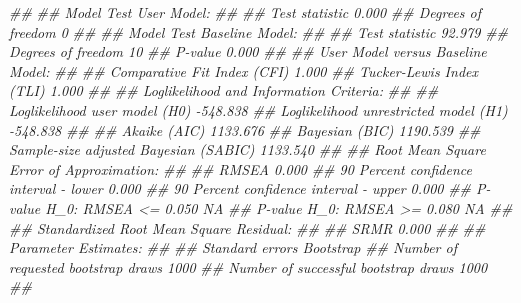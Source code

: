 \documentclass[
  chinese-hans,
  letterpaper,
  DIV=11,
  numbers=noendperiod]{scrartcl}
\newenvironment{Shaded}{\begin{snugshade}}{\end{snugshade}}
\newcommand{\DocumentationTok}[1]{\textcolor[rgb]{0.37,0.37,0.37}{\textit{#1}}}
\begin{document}
\begin{Shaded}
\begin{Highlighting}[numbers=left,,]
\DocumentationTok{\#\# }
\DocumentationTok{\#\# Model Test User Model:}
\DocumentationTok{\#\#                                                       }
\DocumentationTok{\#\#   Test statistic                                 0.000}
\DocumentationTok{\#\#   Degrees of freedom                                 0}
\DocumentationTok{\#\# }
\DocumentationTok{\#\# Model Test Baseline Model:}
\DocumentationTok{\#\# }
\DocumentationTok{\#\#   Test statistic                                92.979}
\DocumentationTok{\#\#   Degrees of freedom                                10}
\DocumentationTok{\#\#   P{-}value                                        0.000}
\DocumentationTok{\#\# }
\DocumentationTok{\#\# User Model versus Baseline Model:}
\DocumentationTok{\#\# }
\DocumentationTok{\#\#   Comparative Fit Index (CFI)                    1.000}
\DocumentationTok{\#\#   Tucker{-}Lewis Index (TLI)                       1.000}
\DocumentationTok{\#\# }
\DocumentationTok{\#\# Loglikelihood and Information Criteria:}
\DocumentationTok{\#\# }
\DocumentationTok{\#\#   Loglikelihood user model (H0)               {-}548.838}
\DocumentationTok{\#\#   Loglikelihood unrestricted model (H1)       {-}548.838}
\DocumentationTok{\#\#                                                       }
\DocumentationTok{\#\#   Akaike (AIC)                                1133.676}
\DocumentationTok{\#\#   Bayesian (BIC)                              1190.539}
\DocumentationTok{\#\#   Sample{-}size adjusted Bayesian (SABIC)       1133.540}
\DocumentationTok{\#\# }
\DocumentationTok{\#\# Root Mean Square Error of Approximation:}
\DocumentationTok{\#\# }
\DocumentationTok{\#\#   RMSEA                                          0.000}
\DocumentationTok{\#\#   90 Percent confidence interval {-} lower         0.000}
\DocumentationTok{\#\#   90 Percent confidence interval {-} upper         0.000}
\DocumentationTok{\#\#   P{-}value H\_0: RMSEA \textless{}= 0.050                       NA}
\DocumentationTok{\#\#   P{-}value H\_0: RMSEA \textgreater{}= 0.080                       NA}
\DocumentationTok{\#\# }
\DocumentationTok{\#\# Standardized Root Mean Square Residual:}
\DocumentationTok{\#\# }
\DocumentationTok{\#\#   SRMR                                           0.000}
\DocumentationTok{\#\# }
\DocumentationTok{\#\# Parameter Estimates:}
\DocumentationTok{\#\# }
\DocumentationTok{\#\#   Standard errors                            Bootstrap}
\DocumentationTok{\#\#   Number of requested bootstrap draws             1000}
\DocumentationTok{\#\#   Number of successful bootstrap draws            1000}
\DocumentationTok{\#\# }

\end{Highlighting}
\end{Shaded}
\end{document}

